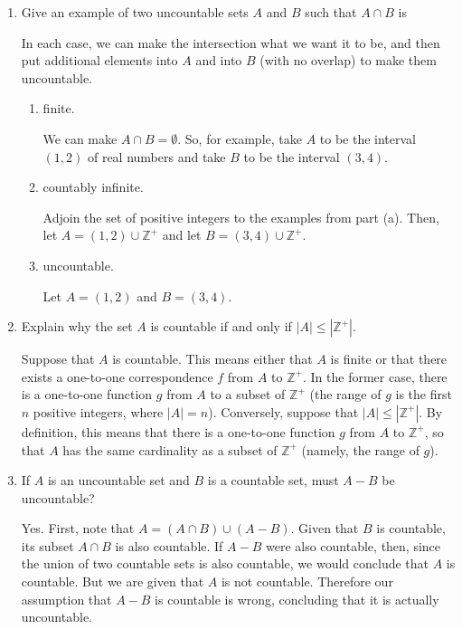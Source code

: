 \documentclass[11pt]{article}
\begin{document}
\begin{enumerate}[label=\textbf{\arabic*.}]
	\item Give an example of two uncountable sets $A$ and $B$ such that $A \cap B$ is
	
	In each case, we can make the intersection what we want it to be, and then put additional elements into $A$ and into $B$ (with no overlap) to make them uncountable.
	
	\begin{enumerate}[label=\textbf{\alph*)}]
		\item finite.
		
		We can make $A \cap B = \emptyset$. So, for example, take $A$ to be the interval $(1, 2)$ of real numbers and take $B$ to be the interval $(3, 4)$.
		
		\item countably infinite.
		
		Adjoin the set of positive integers to the examples from part (a). Then, let $A = (1, 2) \cup \mathbb{Z^+}$ and let $B = (3, 4) \cup \mathbb{Z^+}$.		
		\item uncountable.
		
		Let $A = (1, 2)$ and $B = (3, 4)$.
	\end{enumerate}

	\item Explain why the set $A$ is countable if and only if $|A| \leq |\mathbb{Z^+}|$.
	
	Suppose that $A$ is countable. This means either that $A$ is finite or that there exists a one-to-one correspondence $f$ from $A$ to $\mathbb{Z^+}$. In the former case, there is a one-to-one function $g$ from $A$ to a subset of $\mathbb{Z^+}$ (the range of $g$ is the first $n$ positive integers, where $|A| = n$). Conversely, suppose that $|A| \leq |\mathbb{Z^+}|$. By definition, this means that there is a one-to-one function $g$ from $A$ to $\mathbb{Z^+}$, so that $A$ has the same cardinality as a subset of $\mathbb{Z^+}$ (namely, the range of $g$).
	
	\item If $A$ is an uncountable set and $B$ is a countable set, must $A - B$ be uncountable?
	
	Yes. First, note that $A = (A \cap B) \cup (A - B)$. Given that $B$ is countable, its subset $A \cap B$ is also countable. If $A - B$ were also countable, then, since the union of two countable sets is also countable, we would conclude that $A$ is countable. But we are given that $A$ is not countable. Therefore our assumption that $A - B$ is countable is wrong, concluding that it is actually uncountable.
	

\end{enumerate}
\end{document}
